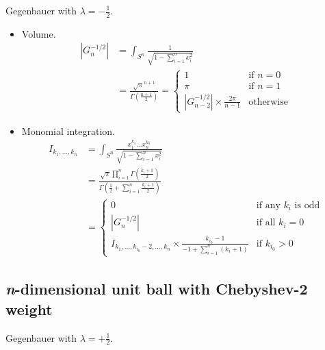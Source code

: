 \documentclass[draft]{scrartcl}
\begin{document}
Gegenbauer with $\lambda=-\frac{1}{2}.$

\begin{itemize}
  \item Volume.
  \[
    \begin{split}
    |G_n^{-1/2}|
      &= \int_{S^n} \frac{1}{\sqrt{1 - \sum_{i=1}^n x_i^2}}\\
      &= \frac{
        \sqrt{\pi}^{n+1}
      }{
        \Gamma\left(\frac{n+1}{2}\right)
      }
      =\begin{cases}
        1&\text{if $n=0$}\\
        \pi&\text{if $n=1$}\\
        |G_{n-2}^{-1/2}| \times \frac{2\pi}{n-1}&\text{otherwise}
      \end{cases}
    \end{split}
  \]

  \item Monomial integration.
  \[
    \begin{split}
    I_{k_1,\dots,k_n}
      &= \int_{S^n} \frac{x_1^{k_1}\dots x_n^{k_n}}{\sqrt{1 - \sum_{i=1}^n x_i^2}}\\
      &= \frac{
        \sqrt{\pi} \prod_{i=1}^n \Gamma\left(\frac{k_i+1}{2}\right)
      }{
        \Gamma\left(\frac{1}{2} + \sum_{i=1}^n \frac{k_i+1}{2}\right)
      }\\
      &= \begin{cases}
        0&\text{if any $k_i$ is odd}\\
        |G_n^{-1/2}|&\text{if all $k_i=0$}\\
        I_{k_1,\dots,k_{i_0}-2,\dots,k_n} \times \frac{k_{i_0}-1}{-1 + \sum_{i=1}^n(k_i+1)}&\text{if $k_{i_0} > 0$}
      \end{cases}
    \end{split}
  \]
\end{itemize}


\subsection*{\textit{n}-dimensional unit ball with Chebyshev-2 weight}
Gegenbauer with $\lambda = +\frac{1}{2}.$
\end{document}
